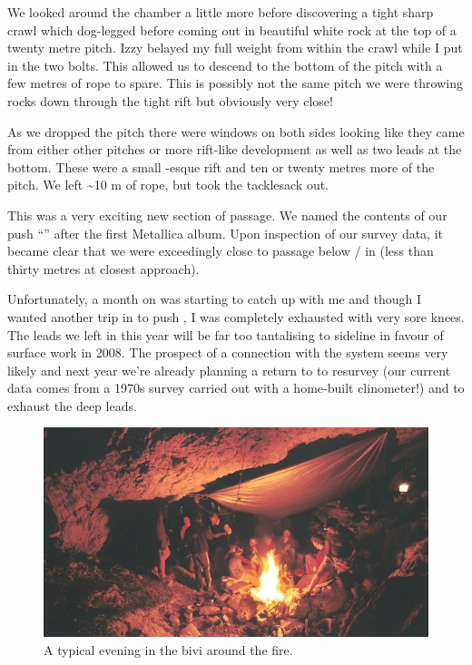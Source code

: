 We looked around the chamber a little more before discovering a tight
sharp crawl which dog-legged before coming out in beautiful white rock
at the top of a twenty metre pitch. Izzy belayed my full weight from
within the crawl while I put in the two bolts. This allowed us to
descend to the bottom of the pitch with a few metres of rope to spare.
This is possibly not the same pitch we were throwing rocks down through
the tight rift but obviously very close!

As we dropped the pitch there were windows on both sides looking like
they came from either other pitches or more rift-like development as
well as two leads at the bottom. These were a small -esque rift and ten or twenty metres more of the pitch. We left
\textasciitilde{}10 m of rope, but took the tacklesack out.

This was a very exciting new section of passage. We named the contents
of our push ``'' after the first Metallica album. Upon
inspection of our survey data, it became clear that we were exceedingly
close to passage below / in  (less than thirty
metres at closest approach).

Unfortunately, a month on  was starting to catch up with me and
though I wanted another trip in  to push , I
was completely exhausted with very sore knees. The leads we left in
 this year will be far too tantalising to sideline in favour of
surface work in 2008. The prospect of a connection with the system seems
very likely and next year we're already planning a return to 
to resurvey (our current data comes from a 1970s survey carried out with
a home-built clinometer!) and to exhaust the deep leads.


\begin{figure}
\checkoddpage \ifoddpage \forcerectofloat \else \forceversofloat \fi
   \centering
\includegraphics[width = \textwidth]{2007/kangaroo/jarvist frost gr1 film2 -031_28.jpg}
\caption{A typical evening in the bivi around the fire. }
\end{figure}

